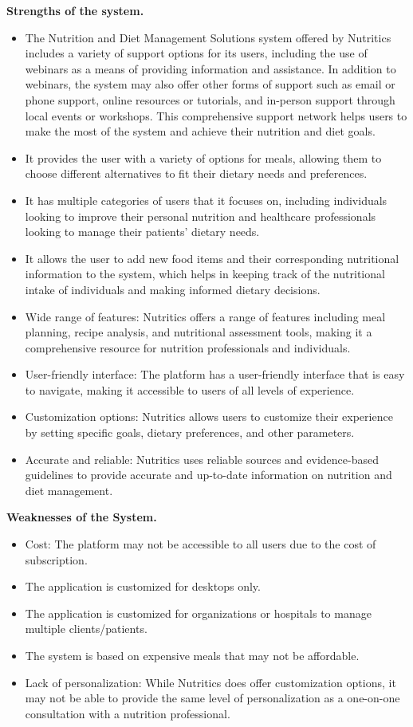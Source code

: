 \documentclass{article}
\begin{document}
\textbf{Strengths of the system.}
\begin{itemize}
\item The Nutrition and Diet Management Solutions system offered by Nutritics includes a variety of support options for its users, including the use of webinars as a means of providing information and assistance. In addition to webinars, the system may also offer other forms of support such as email or phone support, online resources or tutorials, and in-person support through local events or workshops. This comprehensive support network helps users to make the most of the system and achieve their nutrition and diet goals.
\item It provides the user with a variety of options for meals, allowing them to choose different alternatives to fit their dietary needs and preferences.

\item It has multiple categories of users that it focuses on, including individuals looking to improve their personal nutrition and healthcare professionals looking to manage their patients' dietary needs.
\item It allows the user to add new food items and their corresponding nutritional information to the system, which helps in keeping track of the nutritional intake of individuals and making informed dietary decisions.
\item Wide range of features: Nutritics offers a range of features including meal planning, recipe analysis, and nutritional assessment tools, making it a comprehensive resource for nutrition professionals and individuals.
\item User-friendly interface: The platform has a user-friendly interface that is easy to navigate, making it accessible to users of all levels of experience.
\item Customization options: Nutritics allows users to customize their experience by setting specific goals, dietary preferences, and other parameters.
\item Accurate and reliable: Nutritics uses reliable sources and evidence-based guidelines to provide accurate and up-to-date information on nutrition and diet management.

\end{itemize}

\textbf{Weaknesses of the System.}
\begin{itemize}
\item Cost: The platform may not be accessible to all users due to the cost of subscription.
\item The application is customized for desktops only.
\item The application is customized for organizations or hospitals to manage multiple clients/patients.
\item The system is based on expensive meals that may not be affordable.
\item Lack of personalization: While Nutritics does offer customization options, it may not be able to provide the same level of personalization as a one-on-one consultation with a nutrition professional.
\end{itemize}
\end{document}
